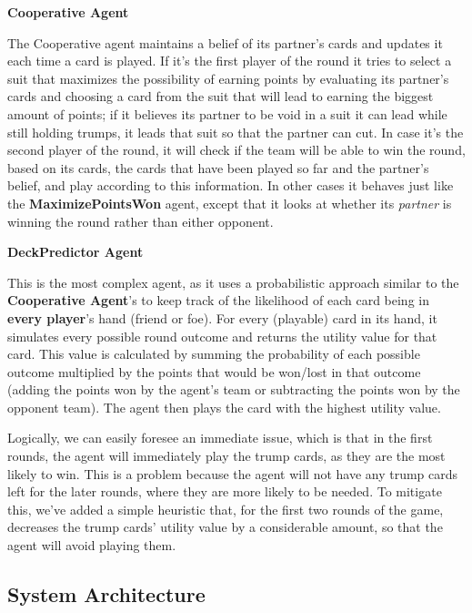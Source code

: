 \documentclass[sigconf]{acmart}
\begin{document}
{\centering\fontsize{11}{24}\selectfont\textbf{Cooperative Agent}\par}
\vspace{2mm} %
The Cooperative agent maintains a belief of its partner's cards and updates it each time a card is played. If it's the first player of the round it tries to select a suit that maximizes the possibility of earning points by evaluating its partner's cards and choosing a card from the suit that will lead to earning the biggest amount of points; if it believes its partner to be void in a suit it can lead while still holding trumps, it leads that suit so that the partner can cut. In case it's the second player of the round, it will check if the team will be able to win the round, based on its cards, the cards that have been played so far and the partner's belief, and play according to this information. In other cases it behaves just like the \textbf{MaximizePointsWon} agent, except that it looks at whether its \textit{partner} is winning the round rather than either opponent.

{\centering\fontsize{11}{24}\selectfont\textbf{DeckPredictor Agent}\par}
\vspace{2mm} %
This is the most complex agent, as it uses a probabilistic approach similar to the \textbf{Cooperative Agent}'s to keep track of the likelihood of each card being in \textbf{every player}'s hand (friend or foe). For every (playable) card in its hand, it simulates every possible round outcome and returns the utility value for that card. This value is calculated by summing the probability of each possible outcome multiplied by the points that would be won/lost in that outcome (adding the points won by the agent's team or subtracting the points won by the opponent team). The agent then plays the card with the highest utility value.

Logically, we can easily foresee an immediate issue, which is that in the first rounds, the agent will immediately play the trump cards, as they are the most likely to win. This is a problem because the agent will not have any trump cards left for the later rounds, where they are more likely to be needed. To mitigate this, we've added a simple heuristic that, for the first two rounds of the game, decreases the trump cards' utility value by a considerable amount, so that the agent will avoid playing them.

\subsection{System Architecture}
\end{document}
